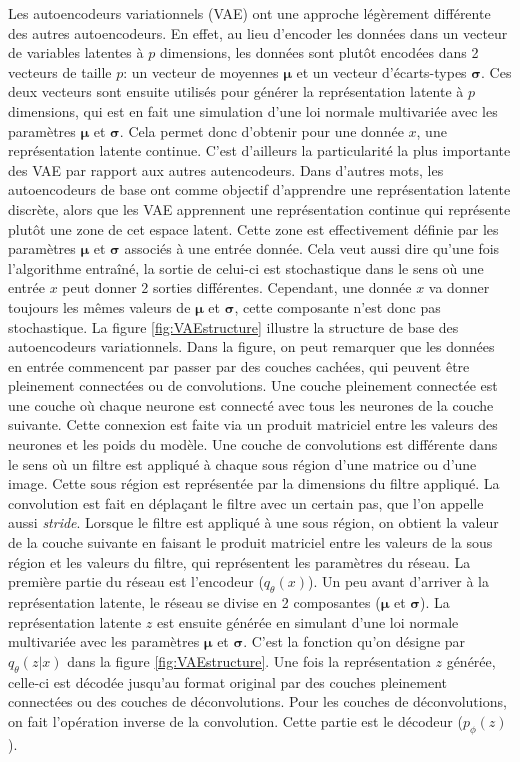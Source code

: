 Les autoencodeurs variationnels (VAE)  \cite{kingma2013autoencoding} ont une approche légèrement différente des autres autoencodeurs. En effet, au lieu d'encoder les données dans un vecteur de variables latentes à $p$ dimensions, les données sont plutôt encodées dans 2 vecteurs de taille $p$: un vecteur de moyennes $\boldsymbol \mu$ et un vecteur d'écarts-types $\boldsymbol \sigma$. Ces deux vecteurs sont ensuite utilisés pour générer la représentation latente à $p$ dimensions, qui est en fait une simulation d'une loi normale multivariée avec les paramètres $\boldsymbol \mu$ et $\boldsymbol \sigma$. Cela permet donc d'obtenir pour une donnée $x$, une représentation latente continue. C'est d'ailleurs la particularité la plus importante des VAE par rapport aux autres autencodeurs. Dans d'autres mots, les autoencodeurs de base ont comme objectif d'apprendre une représentation latente discrète, alors que les VAE apprennent une représentation continue qui représente plutôt une zone de cet espace latent. Cette zone est effectivement définie par les paramètres $\boldsymbol \mu$ et $\boldsymbol \sigma$ associés à une entrée donnée. Cela veut aussi dire qu'une fois l'algorithme entraîné, la sortie de celui-ci est stochastique dans le sens où une entrée $x$ peut donner 2 sorties différentes. Cependant, une donnée $x$ va donner toujours les mêmes valeurs de $\boldsymbol \mu$ et $\boldsymbol \sigma$, cette composante n'est donc pas stochastique. La figure \ref{fig:VAEstructure} illustre la structure de base des autoencodeurs variationnels. Dans la figure, on peut remarquer que les données en entrée commencent par passer par des couches cachées, qui peuvent être pleinement connectées ou de convolutions. Une couche pleinement connectée est une couche où chaque neurone est connecté avec tous les neurones de la couche suivante. Cette connexion est faite via un produit matriciel entre les valeurs des neurones et les poids du modèle. Une couche de convolutions est différente dans le sens où un filtre est appliqué à chaque sous région d'une matrice ou d'une image. Cette sous région est représentée par la dimensions du filtre appliqué. La convolution est fait en déplaçant le filtre avec un certain pas, que l'on appelle aussi \textit{stride}. Lorsque le filtre est appliqué à une sous région, on obtient la valeur de la couche suivante en faisant le produit matriciel entre les valeurs de la sous région et les valeurs du filtre, qui représentent les paramètres du réseau. La première partie du réseau est l'encodeur ($q_{\theta}(x)$). Un peu avant d'arriver à la représentation latente, le réseau se divise en 2 composantes ($\boldsymbol \mu$ et $\boldsymbol \sigma$). La représentation latente $z$ est ensuite générée en simulant d'une loi normale multivariée avec les paramètres $\boldsymbol \mu$ et $\boldsymbol \sigma$. C'est la fonction qu'on désigne par $q_{\theta}(z|x)$ dans la figure \ref{fig:VAEstructure}. Une fois la représentation $z$ générée, celle-ci est décodée jusqu'au format original par des couches pleinement connectées ou des couches de déconvolutions. Pour les couches de déconvolutions, on fait l'opération inverse de la convolution. Cette partie est le décodeur ($p_{\phi}(z)$).

